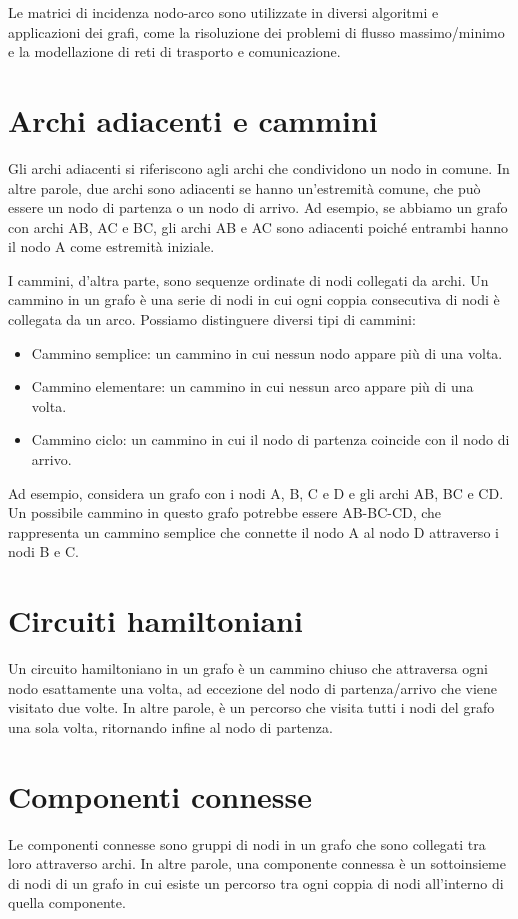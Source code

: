 Le matrici di incidenza nodo-arco sono utilizzate in diversi algoritmi e applicazioni dei grafi, come la risoluzione dei problemi di flusso massimo/minimo e la modellazione di reti di trasporto e comunicazione.


\section{Archi adiacenti e cammini}
Gli archi adiacenti si riferiscono agli archi che condividono un nodo in comune. In altre parole, due archi sono adiacenti se hanno un'estremità comune, che può essere un nodo di partenza o un nodo di arrivo. Ad esempio, se abbiamo un grafo con archi AB, AC e BC, gli archi AB e AC sono adiacenti poiché entrambi hanno il nodo A come estremità iniziale.

I cammini, d'altra parte, sono sequenze ordinate di nodi collegati da archi. Un cammino in un grafo è una serie di nodi in cui ogni coppia consecutiva di nodi è collegata da un arco. Possiamo distinguere diversi tipi di cammini:

\begin{itemize}
  \item Cammino semplice: un cammino in cui nessun nodo appare più di una volta.
  \item Cammino elementare: un cammino in cui nessun arco appare più di una volta.
  \item Cammino ciclo: un cammino in cui il nodo di partenza coincide con il nodo di arrivo.
\end{itemize}

Ad esempio, considera un grafo con i nodi A, B, C e D e gli archi AB, BC e CD. Un possibile cammino in questo grafo potrebbe essere AB-BC-CD, che rappresenta un cammino semplice che connette il nodo A al nodo D attraverso i nodi B e C.

\section{Circuiti hamiltoniani}
Un circuito hamiltoniano in un grafo è un cammino chiuso che attraversa ogni nodo esattamente una volta, ad eccezione del nodo di partenza/arrivo che viene visitato due volte. In altre parole, è un percorso che visita tutti i nodi del grafo una sola volta, ritornando infine al nodo di partenza.

\section{Componenti connesse}
Le componenti connesse sono gruppi di nodi in un grafo che sono collegati tra loro attraverso archi. In altre parole, una componente connessa è un sottoinsieme di nodi di un grafo in cui esiste un percorso tra ogni coppia di nodi all'interno di quella componente.


